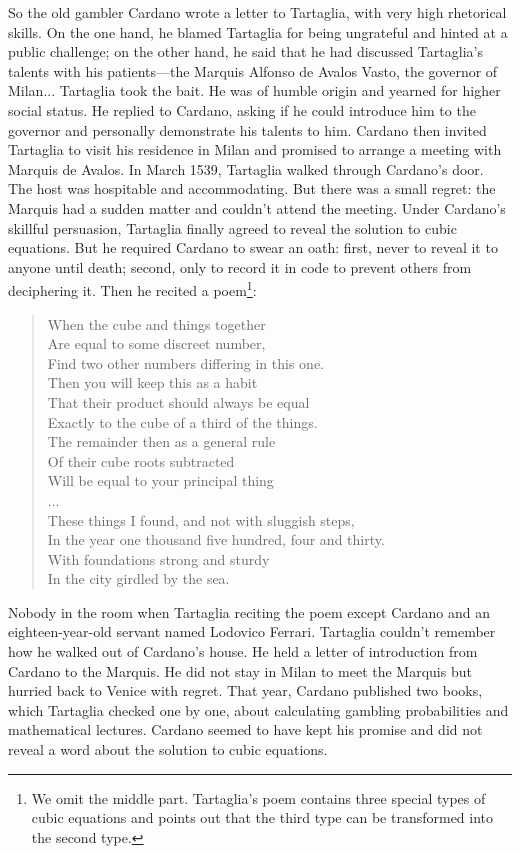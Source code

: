 \documentclass[b5paper]{article}
\begin{document}
So the old gambler Cardano wrote a letter to Tartaglia, with very high rhetorical skills. On the one hand, he blamed Tartaglia for being ungrateful and hinted at a public challenge; on the other hand, he said that he had discussed Tartaglia's talents with his patients—the Marquis Alfonso de Avalos Vasto, the governor of Milan... Tartaglia took the bait. He was of humble origin and yearned for higher social status. He replied to Cardano, asking if he could introduce him to the governor and personally demonstrate his talents to him. Cardano then invited Tartaglia to visit his residence in Milan and promised to arrange a meeting with Marquis de Avalos. In March 1539, Tartaglia walked through Cardano's door. The host was hospitable and accommodating. But there was a small regret: the Marquis had a sudden matter and couldn't attend the meeting. Under Cardano's skillful persuasion, Tartaglia finally agreed to reveal the solution to cubic equations. But he required Cardano to swear an oath: first, never to reveal it to anyone until death; second, only to record it in code to prevent others from deciphering it. Then he recited a poem\footnote{We omit the middle part. Tartaglia's poem contains three special types of cubic equations and points out that the third type can be transformed into the second type.}:

\begin{verse}
When the cube and things together \\
Are equal to some discreet number, \\
Find two other numbers differing in this one. \\
Then you will keep this as a habit \\
That their product should always be equal \\
Exactly to the cube of a third of the things. \\
The remainder then as a general rule \\
Of their cube roots subtracted \\
Will be equal to your principal thing \\
... \\
These things I found, and not with sluggish steps, \\
In the year one thousand five hundred, four and thirty. \\
With foundations strong and sturdy \\
In the city girdled by the sea.
\end{verse}

Nobody in the room when Tartaglia reciting the poem except Cardano and an eighteen-year-old servant named Lodovico Ferrari. Tartaglia couldn't remember how he walked out of Cardano's house. He held a letter of introduction from Cardano to the Marquis. He did not stay in Milan to meet the Marquis but hurried back to Venice with regret. That year, Cardano published two books, which Tartaglia checked one by one, about calculating gambling probabilities and mathematical lectures. Cardano seemed to have kept his promise and did not reveal a word about the solution to cubic equations.
\end{document}
